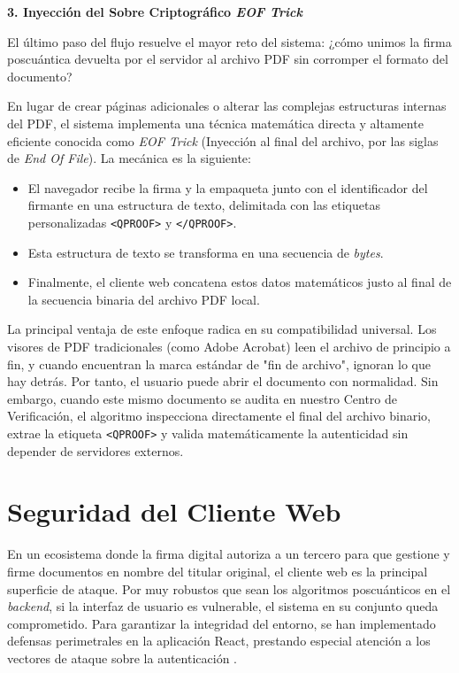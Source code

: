 \documentclass[11pt, a4paper]{report}
\theoremstyle{definition}
\begin{document}
\textbf{3. Inyección del Sobre Criptográfico \textit{EOF Trick}}\vspace{0.3cm}

El último paso del flujo resuelve el mayor reto del sistema: ¿cómo unimos la firma poscuántica devuelta por el servidor al archivo PDF sin corromper el formato del documento?

En lugar de crear páginas adicionales o alterar las complejas estructuras internas del PDF, el sistema implementa una técnica matemática directa y altamente eficiente conocida como \textit{EOF Trick} (Inyección al final del archivo, por las siglas de \textit{End Of File}). La mecánica es la siguiente:

\begin{itemize}
    \item El navegador recibe la firma y la empaqueta junto con el identificador del firmante en una estructura de texto, delimitada con las etiquetas personalizadas \texttt{<QPROOF>} y \texttt{</QPROOF>}.
    \item Esta estructura de texto se transforma en una secuencia de \textit{bytes}.
    \item Finalmente, el cliente web concatena estos datos matemáticos justo al final de la secuencia binaria del archivo PDF local.
\end{itemize}

La principal ventaja de este enfoque radica en su compatibilidad universal. Los visores de PDF tradicionales (como Adobe Acrobat) leen el archivo de principio a fin, y cuando encuentran la marca estándar de "fin de archivo", ignoran lo que hay detrás. Por tanto, el usuario puede abrir el documento con normalidad. Sin embargo, cuando este mismo documento se audita en nuestro Centro de Verificación, el algoritmo inspecciona directamente el final del archivo binario, extrae la etiqueta \texttt{<QPROOF>} y valida matemáticamente la autenticidad sin depender de servidores externos.

\section{Seguridad del Cliente Web}
\label{sec:bastionado_seguridad}

En un ecosistema donde la firma digital autoriza a un tercero para que gestione y firme documentos en nombre del titular original, el cliente web es la principal superficie de ataque. Por muy robustos que sean los algoritmos poscuánticos en el \textit{backend}, si la interfaz de usuario es vulnerable, el sistema en su conjunto queda comprometido. Para garantizar la integridad del entorno, se han implementado defensas perimetrales en la aplicación React, prestando especial atención a los vectores de ataque sobre la autenticación \cite{owasp_auth}.\vspace{0.3cm}
\end{document}
